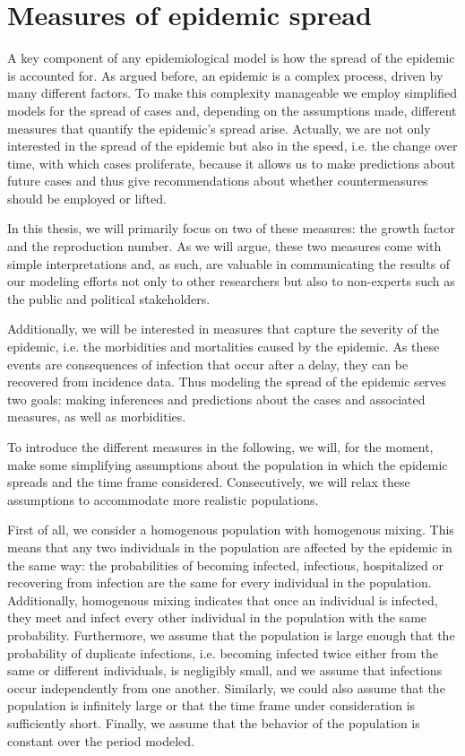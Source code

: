 \section{Measures of epidemic spread}
\label{sec:measures_of_epidemic_spread}
A key component of any epidemiological model is how the spread of the epidemic is accounted for. As argued before, an epidemic is a complex process, driven by many different factors. To make this complexity manageable we employ simplified models for the spread of cases and, depending on the assumptions made, different measures that quantify the epidemic's spread arise. Actually, we are not only interested in the spread of the epidemic but also in the speed, i.e. the change over time, with which cases proliferate, because it allows us to make predictions about future cases and thus give recommendations about whether countermeasures should be employed or lifted.

In this thesis, we will primarily focus on two of these measures: the growth factor and the reproduction number. As we will argue, these two measures come with simple interpretations and, as such, are valuable in communicating the results of our modeling efforts not only to other researchers but also to non-experts such as the public and political stakeholders.

Additionally, we will be interested in measures that capture the severity of the epidemic, i.e. the morbidities and mortalities caused by the epidemic. As these events are consequences of infection that occur after a delay, they can be recovered from incidence data. Thus modeling the spread of the epidemic serves two goals: making inferences and predictions about the cases and associated measures, as well as morbidities.

To introduce the different measures in the following, we will, for the moment, make some simplifying assumptions about the population in which the epidemic spreads and the time frame considered. Consecutively, we will relax these assumptions to accommodate more realistic populations. 

First of all, we consider a homogenous population with homogenous mixing. This means that any two individuals in the population are affected by the epidemic in the same way: the probabilities of becoming infected, infectious, hospitalized or recovering from infection are the same for every individual in the population. Additionally, homogenous mixing indicates that once an individual is infected, they meet and infect every other individual in the population with the same probability. 
Furthermore, we assume that the population is large enough that the probability of duplicate infections, i.e. becoming infected twice either from the same or different individuals, is negligibly small, and we assume that infections occur independently from one another. Similarly, we could also assume that the population is infinitely large or that the time frame under consideration is sufficiently short.
Finally, we assume that the behavior of the population is constant over the period modeled. 


